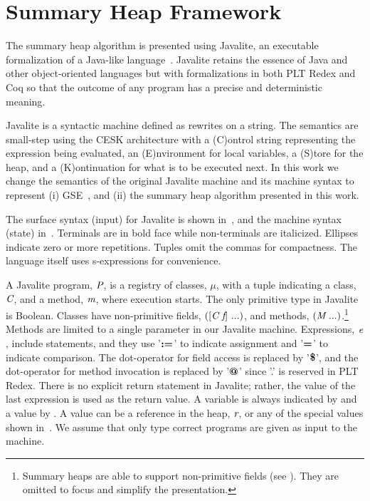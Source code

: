 \section{Summary Heap Framework}
The summary heap algorithm is presented using Javalite, an
executable formalization of a Java-like language~\cite{saints-MS}. Javalite retains 
the essence of Java and other object-oriented languages but with formalizations 
in both PLT Redex and Coq so that the outcome of any program has a precise
and deterministic meaning.

Javalite is a syntactic machine defined as rewrites on a string.  The
semantics are small-step using the CESK architecture with a (C)ontrol string
representing the expression being evaluated, an (E)nvironment for
local variables, a (S)tore for the heap, and a (K)ontinuation for what
is to be executed next.  In this work we change the semantics of the original
 Javalite machine and its machine syntax to represent (i) GSE~\cite{GSE03}, and (ii) the summary heap algorithm
presented in this work.

The surface syntax (input) for Javalite is shown 
in~, and the machine syntax (state)
in~. Terminals are in bold face while
non-terminals are italicized. Ellipses indicate zero or more
repetitions. Tuples omit the commas for compactness. The language
itself uses s-expressions for convenience.




A Javalite program, $\emph{P}$, is a registry of classes, $\mu$, with
a tuple indicating a class, $\emph{C}$, and a method, $\emph{m}$,
where execution starts. The only primitive type in Javalite is
Boolean. Classes have non-primitive fields, $([\cfgnt{C}\ \cfgnt{f}]\ ...)$, and
methods, $(\cfgnt{M}\ ...)$.\footnote{Summary heaps are able to support non-primitive fields (see ). They are omitted to focus and simplify the presentation.} Methods are limited to a single
parameter in our Javalite machine. Expressions, $\emph{e}$,  
include statements, and they
 use '$\textbf{:=}$' to indicate assignment and '$\textbf{=}$' to indicate comparison.
The dot-operator for field access is replaced by '$\textbf{\$}$', and the dot-operator
for method invocation is replaced by '$\textbf{@}$' since '.' is reserved in PLT Redex. There is no explicit return
statement in Javalite; rather, the value of the last expression is
used as the return value. A variable is always indicated by 
and a value by . A value can be a reference in the heap, $\emph{r}$, or any of the special values shown in~. 
We assume that only
type correct programs are given as input to the machine.

